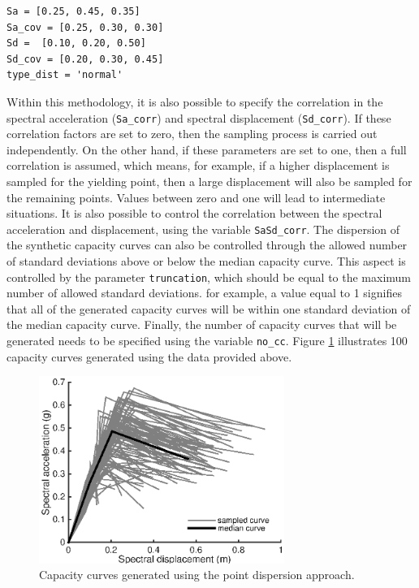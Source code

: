 \begin{Verbatim}[frame=single, commandchars=\\\{\}, samepage=true]
Sa = [0.25, 0.45, 0.35]
Sa_cov = [0.25, 0.30, 0.30]
Sd =  [0.10, 0.20, 0.50]
Sd_cov = [0.20, 0.30, 0.45]
type_dist = 'normal'
\end{Verbatim}

Within this methodology, it is also possible to specify the correlation in the spectral acceleration (\verb=Sa_corr=) and spectral displacement (\verb=Sd_corr=). If these correlation factors are set to zero, then the sampling process is carried out independently. On the other hand, if these parameters are set to one, then a full correlation is assumed, which means, for example, if a higher displacement is sampled for the yielding point, then a large displacement will also be sampled for the remaining points. Values between zero and one will lead to intermediate situations. It is also possible to control the correlation between the spectral acceleration and displacement, using the variable \verb=SaSd_corr=.
The dispersion of the synthetic capacity curves can also be controlled through the allowed number of standard deviations above or below the median capacity curve. This aspect is controlled by the parameter \verb=truncation=, which should be equal to the maximum number of allowed standard deviations. for example, a value equal to 1 signifies that all of the generated capacity curves will be within one standard deviation of the median capacity curve. Finally, the number of capacity curves that will be generated needs to be specified using the variable \verb=no_cc=. Figure \ref{fig:dispersion_cc} illustrates 100 capacity curves generated using the data provided above.

\begin{figure}[htb]
  \centering
      \includegraphics[width=8cm]{Figures/dispersion_cc.eps}
  \caption{Capacity curves generated using the point dispersion approach.}
  \label{fig:dispersion_cc}
\end{figure}